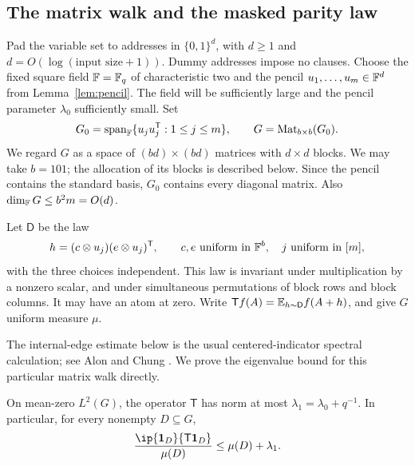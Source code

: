 \subsection{The matrix walk and the masked parity law}

Pad the variable set to addresses in $\{0,1\}^d$, with $d\geq1$ and
$d=O(\log(\text{input size}+1))$. Dummy addresses impose no clauses.
Choose the fixed square field $\mathbb F=\mathbb F_q$ of characteristic two and
the pencil $u_1,\ldots,u_m\in\mathbb F^d$ from Lemma~\ref{lem:pencil}.
The field will be sufficiently large and the pencil parameter
$\lambda_0$ sufficiently small. Set
\[
 G_0=\operatorname{span}_{\mathbb F}\{u_j u_j^{\mathsf T}:1\leq j\leq m\},
 \qquad G=\operatorname{Mat}_{b\times b}(G_0).
\]
We regard $G$ as a space of $(bd)\times(bd)$ matrices with $d\times d$
blocks. We may take $b=101$; the allocation of its blocks is described
below. Since the pencil contains the standard basis, $G_0$ contains
every diagonal matrix. Also $\dim_{\mathbb F}G\leq b^2m=O(d)$.

Let $\mathsf D$ be the law
\begin{equation}\label{eq:rank-one-direction}
 h=(c\otimes u_j)(e\otimes u_j)^{\mathsf T},
 \qquad c,e\ \text{uniform in }\mathbb F^b,\quad j\ \text{uniform in }[m],
\end{equation}
with the three choices independent. This law is invariant under
multiplication by a nonzero scalar, and under simultaneous permutations
of block rows and block columns. It may have an atom at zero.
Write
$\mathsf T f(A)=\mathbb E_{h\sim\mathsf D}f(A+h)$, and give $G$ uniform measure
$\mu$.

The internal-edge estimate below is the usual centered-indicator
spectral calculation; see Alon and Chung \cite[Lemma~2.3]{AlonChung1988}.
We prove the eigenvalue bound for this particular matrix walk directly.

\begin{lemma}\label{lem:matrix-walk}
On mean-zero $L^2(G)$, the operator $\mathsf T$ has norm at most
$\lambda_1=\lambda_0+q^{-1}$. In particular, for every nonempty
$D\subseteq G$,
\begin{equation}\label{eq:internal-edge-bound}
 \frac{\ip{\ind_D}{\mathsf T\ind_D}}{\mu(D)}
 \leq \mu(D)+\lambda_1.
\end{equation}
\end{lemma}


